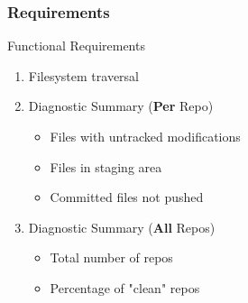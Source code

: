 \begin{frame}
	\centering
	\frametitle{Requirements}
	\begin{block}{Functional Requirements}
		\begin{enumerate}
			\item <1-> Filesystem traversal
			\item <2->Diagnostic Summary (\textbf{Per} Repo)
			\pause
			\begin{itemize}
				\item <3-> Files with untracked modifications
				\item <3-> Files in staging area
				\item <3-> Committed files not pushed
			\end{itemize}
			\item <4-> Diagnostic Summary (\textbf{All} Repos)
			\begin{itemize}
				\item <5-> Total number of repos
				\item <5-> Percentage of "clean" repos
			\end{itemize}
		\end{enumerate}		
	\end{block}
\end{frame}